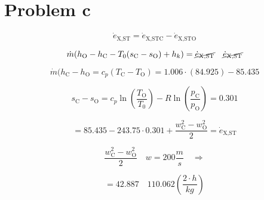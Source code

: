 \section*{Problem c}

\[
\dot{e}_{\text{X,ST}} = \dot{e}_{\text{X,STC}} - \dot{e}_{\text{X,STO}}
\]

\[
\dot{m} (h_{\text{O}} - h_{\text{C}} - T_0 (s_{\text{C}} - s_{\text{O}}) + h_k) = \cancel{\dot{e}_{\text{X,ST}}} \quad \cancel{\dot{e}_{\text{X,ST}}}
\]

\[
\dot{m} (h_{\text{C}} - h_{\text{O}} = c_p (T_{\text{C}} - T_{\text{O}}) = 1.006 \cdot (84.925) - 85.435
\]

\[
s_{\text{C}} - s_{\text{O}} = c_p \ln \left( \frac{T_{\text{O}}}{T_0} \right) - R \ln \left( \frac{p_{\text{C}}}{p_{\text{O}}} \right) = 0.301
\]

\[
= 85.435 - 243.75 \cdot 0.301 + \frac{w_{\text{C}}^2 - w_{\text{O}}^2}{2} = \dot{e}_{\text{X,ST}}
\]

\[
\frac{w_{\text{C}}^2 - w_{\text{O}}^2}{2} \quad w = 200 \frac{m}{s} \quad \Rightarrow
\]

\[
= 42.887 \quad 110.062 \left( \frac{2 \cdot h}{kg} \right)
\]